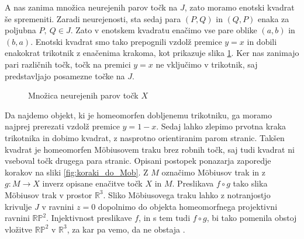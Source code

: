 \documentclass[mat1]{fmfdelo}
\newcommand{\R}{\mathbb R}
\newcommand{\arrows}[5][]{
  \draw[->, #1] (#2, #3) -- (0.75*#2 + 0.25*#4, 0.75*#3 + 0.25*#5);
  \draw[->, #1] (0.75*#2 + 0.25*#4, 0.75*#3 + 0.25*#5) -- (0.5*#2 + 0.5*#4, 0.5*#3 + 0.5*#5);
  \draw[->, #1] (0.5*#2 + 0.5*#4, 0.5*#3 + 0.5*#5) -- (0.25*#2 + 0.75*#4, 0.25*#3 + 0.75*#5);
  \draw[->, #1] (0.25*#2 + 0.75*#4, 0.25*#3 + 0.75*#5) -- (#4, #5);
}
\begin{document}
A nas zanima množica neurejenih parov točk na $J$, zato moramo enotski kvadrat še spremeniti. Zaradi neurejenosti, sta sedaj para $(P, Q)$ in $(Q, P)$ enaka za poljubna $P,\ Q \in J$. Zato v enotskem kvadratu enačimo vse pare oblike $(a, b)$ in $(b, a)$. Enotski kvadrat smo tako prepognili vzdolž premice $y = x$ in dobili enakokrat trikotnik z enačenima krakoma, kot prikazuje slika \ref{fig:prvi_pregib}. Ker nas zanimajo pari različnih točk, točk na premici $y = x$ ne vključimo v trikotnik, saj predstavljajo posamezne točke na $J$. 

\begin{figure}[h!]
\caption{Množica neurejenih parov točk $X$}
\label{fig:prvi_pregib}
\end{figure}

Da najdemo objekt, ki je homeomorfen dobljenemu trikotniku, ga moramo najprej prerezati vzdolž premice $y = 1 - x$. Sedaj lahko zlepimo prvotna kraka trikotnika in dobimo kvadrat, z nasprotno orientiranim parom stranic. Takšen kvadrat je homeomorfen M\"obiusovem traku brez robnih točk, saj tudi kvadrat ni vseboval točk drugega para stranic. Opisani postopek ponazarja zaporedje korakov na sliki \ref{fig:koraki_do_Mob}. Z $M$ označimo M\"obiusov trak in z $g \colon M \to X$ inverz opisane enačitve točk $X$ in $M$. Preslikava $f \circ g$ tako slika M\"obiusov trak v prostor $\R^3$. Sliko M\"obiusovega traku lahko z notranjostjo krivulje $J$ v ravnini $z=0$ dopolnimo do objekta homeomorfnega projektivni ravnini $\R \mathbb{P} ^2$. Injektivnost preslikave $f$, in s tem tudi $f \circ g$, bi tako pomenila obstoj vložitve $\R\mathbb{P}^2$ v $\R^3$, za kar pa vemo, da ne obstaja \cite{rp2_wiki}.
\end{document}
